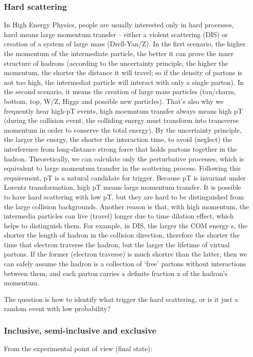 \subsubsection{Hard scattering}
In High Energy Physics, people are usually interested only in hard processes,
hard means large momentum transfer -- either a violent scattering (DIS) or creation
of a system of large mass (Drell-Yan/Z). In the first scenario, the higher 
the momentum of the intermediate particle, the better it can prove the inner 
structure of hadrons (according to the uncertainty principle, the higher the 
momentum, the shorter the distance it will travel; so if the density of partons
is not too high, the intermediat particle will interact with only a single parton). 
In the second scenario, it means the creation of large 
mass particles (tau/charm, bottom, top, W/Z, Higgs and possible new particles).
That's also why we frequently hear high-pT events, high moemntum transfer always
means high pT (during the collision event, the colliding energy must transform
into transverse momentum in order to conserve the total energy). 
By the uncertainty principle, the larger the energy, the shorter the 
interaction time, to avoid (neglect) the interference from long-distance strong force 
that holds partons together in the hadron. Theoretically, we can calculate only 
the perturbative processes, which is equivalent to large momentum transfer in 
the scattering process. Following this requirement, pT is a natural candidate 
for trigger. Because pT is invariant under Lorentz transformation, high pT means
large momentum transfer. It is possible to have hard scattering with low pT, 
but they are hard to be distinguished from the large collision backgrounds.
Another reason is that, with high momentum, the intermedia particles can live (travel)
longer due to time dilation effect, which helps to distinguish them. For example,
in DIS, the larger the COM energy s, the shorter the length of hadron in the
collision direction, therefore the shorter the time that electron traverse the
hadron, but the larger the lifetime of virtual partons. If the former (electron
traverse) is much shortre than the latter, then we can safely assume the hadron
is a collection of `free' partons without interactions between them, and each
parton carries a definite fraction x of the hadron's momentum.

The question is how to identify what trigger the hard scattering, or is it 
just a random event with low probability?

\subsubsection{Inclusive, semi-inclusive and exclusive}
From the experimental point of view (final state):

